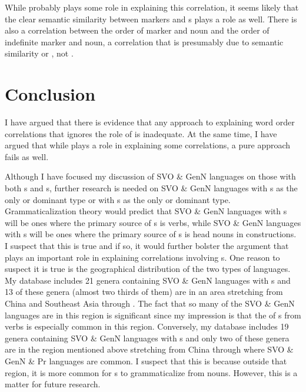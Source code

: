 \documentclass[output=paper]{langsci/langscibook}
\begin{document}
While  probably plays some role in explaining this correlation, it seems likely that the clear semantic similarity between  markers and s plays a role as well. There is also a correlation between the order of  marker and noun and the order of indefinite marker and noun, a correlation that is presumably due to semantic similarity or , not .

\section{Conclusion}\label{sec:dryer:5}

I have argued that there is evidence that any approach to explaining word order correlations that ignores the role of  is inadequate. At the same time, I have argued that while  plays a role in explaining some correlations, a pure  approach fails as well.

Although I have focused my discussion of SVO \& GenN languages on those with both s and s, further research is needed on SVO \& GenN languages with s as the only or dominant type or with s as the only or dominant type. Grammaticalization theory would predict that SVO \& GenN languages with s will be ones where the primary source of s is verbs, while SVO \& GenN languages with s will be ones where the primary source of s is head nouns in  constructions. I suspect that this is true and if so, it would further bolster the argument that  plays an important role in explaining correlations involving s. One reason to suspect it is true is the geographical distribution of the two types of languages. My database includes 21 genera containing SVO \& GenN languages with s and 13 of these genera (almost two thirds of them) are in an area stretching from China and Southeast Asia through . The fact that so many of the SVO \& GenN languages are in this region is significant since my impression is that the  of s from verbs is especially common in this region. Conversely, my database includes 19 genera containing SVO \& GenN languages with s and only two of these genera are in the region mentioned above stretching from China through  where SVO \& GenN \& Pr languages are common. I suspect that this is because outside that region, it is more common for s to grammaticalize from nouns. However, this is a matter for future research.
\end{document}
